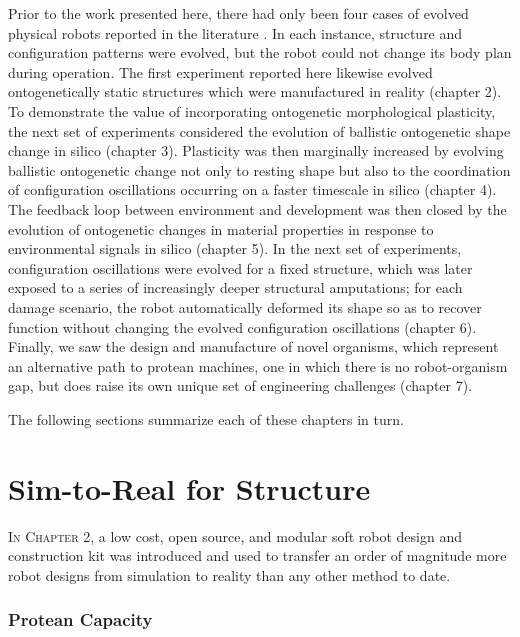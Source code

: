 Prior to the work presented here,
there had only been four cases of evolved physical robots reported in the literature
\cite{lipson2000automatic,hiller2012automatic,brodbeck2015morphological,cellucci20171d}.
In each instance, structure and configuration patterns were evolved, but the robot could not change its body plan during operation.
The first experiment reported here likewise evolved ontogenetically static structures which were manufactured in reality (chapter 2).
To demonstrate 
the value of incorporating ontogenetic morphological plasticity,
the next set of experiments considered
the evolution of ballistic ontogenetic shape change in silico (chapter 3).
Plasticity was then marginally increased by
evolving ballistic ontogenetic change not only to resting shape but also to the coordination of configuration oscillations occurring on a faster timescale in silico (chapter 4).
The feedback loop between environment and development was then closed by
the evolution of ontogenetic changes in material properties in response to environmental signals in silico (chapter 5).
In the next set of experiments,
configuration oscillations were evolved for a fixed structure,
which was later exposed to a series of 
increasingly deeper structural amputations;
for each damage scenario, the robot automatically deformed its shape so as to recover function without changing the evolved configuration oscillations (chapter 6).
Finally, we saw the design and manufacture of novel organisms, which represent an alternative path to protean machines, one in which there is no robot-organism gap, but does raise its own unique set of engineering challenges (chapter 7).

The following sections summarize each of these 
chapters in turn.


\section{Sim-to-Real for Structure}

\textsc{In Chapter 2,}
a low cost, open source, and modular soft robot design and construction kit was introduced and used to
transfer an order of magnitude more robot designs from simulation to reality than any other method to date.

\subsubsection*{Protean Capacity}

